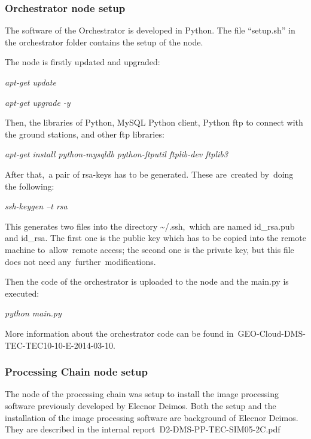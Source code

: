 \documentclass[a4paper]{article}
\begin{document}
\subsubsection[Orchestrator node setup]{Orchestrator node setup}
\hypertarget{Toc390097025}{}The software of the Orchestrator is
developed in Python. The file
{\textquotedblleft}setup.sh{\textquotedblright} in the orchestrator
folder contains the setup of the node.


\bigskip

The node is firstly updated and upgraded:


\bigskip

{\itshape
apt-get update}

{\itshape
apt-get upgrade -y}


\bigskip

Then, the libraries of Python, MySQL Python client, Python ftp to
connect with the ground stations, and other ftp libraries:

{\itshape
apt-get install python-mysqldb python-ftputil ftplib-dev ftplib3}


\bigskip

After that,\ a pair of rsa-keys has to be generated. These are\ created
by\ doing the following:\ 


\bigskip

{\itshape
ssh-keygen --t rsa\ }


\bigskip

This generates two files into the directory \~{}/.ssh,\ which are named
id\_rsa.pub and id\_rsa. The first one is the public key which has to
be copied into the remote machine to\ allow\ remote access; the second
one is the private key, but this file does not need
any\ further\ modifications.\ 


\bigskip

Then the code of the orchestrator is uploaded to the node and the
main.py is executed:


\bigskip

{\itshape
python main.py}


\bigskip

More information about the orchestrator code can be found
in\ GEO-Cloud-DMS-TEC-TEC10-10-E-2014-03-10.

\subsubsection[Processing Chain node setup]{Processing Chain node setup}
\hypertarget{Toc390097026}{}The node of the processing chain was setup
to install the image processing software previously developed by
Elecnor Deimos. Both the setup and the installation of the image
processing software are background of Elecnor Deimos. They are
described in the internal report\ D2-DMS-PP-TEC-SIM05-2C.pdf
\end{document}
